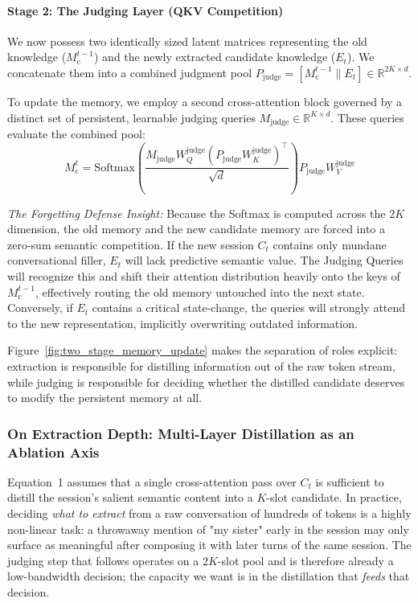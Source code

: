 \documentclass[11pt, a4paper]{article}
\begin{document}
\paragraph{Stage 2: The Judging Layer (QKV Competition)}
We now possess two identically sized latent matrices representing the old knowledge ($M_{\text{c}}^{t-1}$) and the newly extracted candidate knowledge ($E_t$). We concatenate them into a combined judgment pool $P_{\text{judge}} =[M_{\text{c}}^{t-1} \parallel E_t] \in \mathbb{R}^{2K \times d}$.

To update the memory, we employ a second cross-attention block governed by a distinct set of persistent, learnable judging queries $M_{\text{judge}} \in \mathbb{R}^{K \times d}$. These queries evaluate the combined pool:
\begin{equation}
    M_{\text{c}}^{t} = \text{Softmax}\left(\frac{M_{\text{judge}} W_Q^{\text{judge}} (P_{\text{judge}} W_K^{\text{judge}})^\top}{\sqrt{d}}\right) P_{\text{judge}} W_V^{\text{judge}}
\end{equation}

\textit{The Forgetting Defense Insight:} Because the Softmax is computed across the $2K$ dimension, the old memory and the new candidate memory are forced into a zero-sum semantic competition. If the new session $C_t$ contains only mundane conversational filler, $E_t$ will lack predictive semantic value. The Judging Queries will recognize this and shift their attention distribution heavily onto the keys of $M_{\text{c}}^{t-1}$, effectively routing the old memory untouched into the next state. Conversely, if $E_t$ contains a critical state-change, the queries will strongly attend to the new representation, implicitly overwriting outdated information.

Figure~\ref{fig:two_stage_memory_update} makes the separation of roles explicit: extraction is responsible for distilling information out of the raw token stream, while judging is responsible for deciding whether the distilled candidate deserves to modify the persistent memory at all.

\subsubsection{On Extraction Depth: Multi-Layer Distillation as an Ablation Axis}
\label{sec:extraction_depth}

Equation~1 assumes that a single cross-attention pass over $C_t$ is sufficient to distill the session's salient semantic content into a $K$-slot candidate. In practice, deciding \textit{what to extract} from a raw conversation of hundreds of tokens is a highly non-linear task: a throwaway mention of "my sister" early in the session may only surface as meaningful after composing it with later turns of the same session. The judging step that follows operates on a $2K$-slot pool and is therefore already a low-bandwidth decision; the capacity we want is in the distillation that \emph{feeds} that decision.
\end{document}
